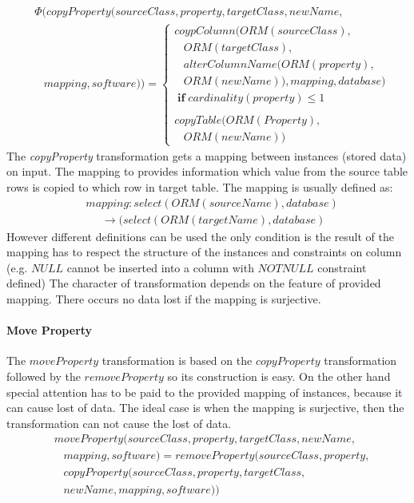 \documentclass[runningheads]{comsis}
\begin{document}
\begin{align}
& \Phi(copyProperty(sourceClass, property, targetClass, newName, \nonumber \\ 
&  \; \; \; mapping, software)) = \begin{cases}
 coypColumn(ORM(sourceClass),  \\ \;\;\; ORM(targetClass),  \\ \;\;\;alterColumnName(ORM(property), \\ \;\;\; ORM(newName)), mapping, database) \\ \; \mathbf{if} \; cardinality(property) \leq 1 \\\\
 copyTable(ORM(Property), \\ \;\;\; ORM(newName))
 \end{cases}
\end{align}
The \emph{copyProperty} transformation gets a mapping between instances (stored data) on input. The mapping to provides information which value from the source table rows is copied to which row in target table. The mapping is usually defined as: 
\begin{align}\label{eq:mapping}
&	mapping : select(ORM(sourceName), database) \nonumber \\ 
& \;\;\;\;\; \rightarrow  (select(ORM(targetName), database) 
\end{align}
However different definitions can be used the only condition is the result of the mapping has to respect the structure of the instances and constraints on column (e.g. $NULL$ cannot be inserted into a column with $NOTNULL$ constraint defined) The character of transformation depends on the feature of provided mapping. There occurs no data lost if the mapping is surjective.

\paragraph{Move Property}
The $moveProperty$ transformation is based on the $copyProperty$ transformation followed by the $removeProperty$ so its construction is easy. On the other hand special attention has to be paid to the provided mapping of instances, because it can cause lost of data. The ideal case is when the mapping is surjective, then the transformation can not cause the lost of data. %
\begin{align}
& moveProperty(sourceClass, property, targetClass, newName,\nonumber  \\
& \;\;\; mapping, software) = removeProperty(sourceClass, property, \nonumber \\
& \;\;\; copyProperty(sourceClass, property, targetClass, \nonumber \\ 
& \;\;\;newName, mapping, software))
\end{align}
\end{document}
